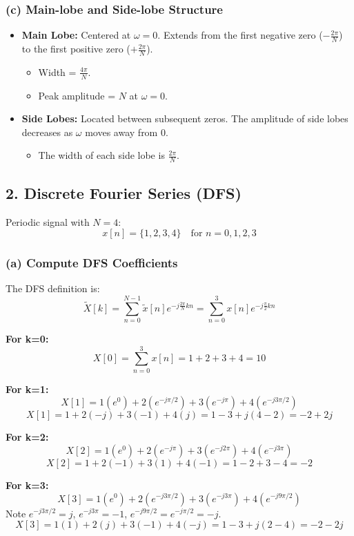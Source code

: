 \documentclass[11pt, a4paper]{article}
\begin{document}
\subsubsection{(c) Main-lobe and Side-lobe Structure}
\begin{itemize}
    \item \textbf{Main Lobe:} Centered at $\omega = 0$. Extends from the first negative zero ($-\frac{2\pi}{N}$) to the first positive zero ($+\frac{2\pi}{N}$).
    \begin{itemize}
        \item Width = $\frac{4\pi}{N}$.
        \item Peak amplitude = $N$ at $\omega = 0$.
    \end{itemize}
    \item \textbf{Side Lobes:} Located between subsequent zeros. The amplitude of side lobes decreases as $\omega$ moves away from 0.
    \begin{itemize}
        \item The width of each side lobe is $\frac{2\pi}{N}$.
    \end{itemize}
\end{itemize}

\subsection{2. Discrete Fourier Series (DFS)}
Periodic signal with $N=4$:
$$ x[n] = \{1, 2, 3, 4\} \quad \text{for } n=0,1,2,3 $$

\subsubsection{(a) Compute DFS Coefficients}
The DFS definition is:
$$ \tilde{X}[k] = \sum_{n=0}^{N-1} \tilde{x}[n] e^{-j\frac{2\pi}{N}kn} = \sum_{n=0}^{3} x[n] e^{-j\frac{\pi}{2}kn} $$

\textbf{For k=0:}
$$ X[0] = \sum_{n=0}^{3} x[n] = 1 + 2 + 3 + 4 = 10 $$

\textbf{For k=1:}
$$ X[1] = 1(e^0) + 2(e^{-j\pi/2}) + 3(e^{-j\pi}) + 4(e^{-j3\pi/2}) $$
$$ X[1] = 1 + 2(-j) + 3(-1) + 4(j) = 1 - 3 + j(4-2) = -2 + 2j $$

\textbf{For k=2:}
$$ X[2] = 1(e^0) + 2(e^{-j\pi}) + 3(e^{-j2\pi}) + 4(e^{-j3\pi}) $$
$$ X[2] = 1 + 2(-1) + 3(1) + 4(-1) = 1 - 2 + 3 - 4 = -2 $$

\textbf{For k=3:}
$$ X[3] = 1(e^0) + 2(e^{-j3\pi/2}) + 3(e^{-j3\pi}) + 4(e^{-j9\pi/2}) $$
Note $e^{-j3\pi/2} = j$, $e^{-j3\pi} = -1$, $e^{-j9\pi/2} = e^{-j\pi/2} = -j$.
$$ X[3] = 1(1) + 2(j) + 3(-1) + 4(-j) = 1 - 3 + j(2-4) = -2 - 2j $$
\end{document}
